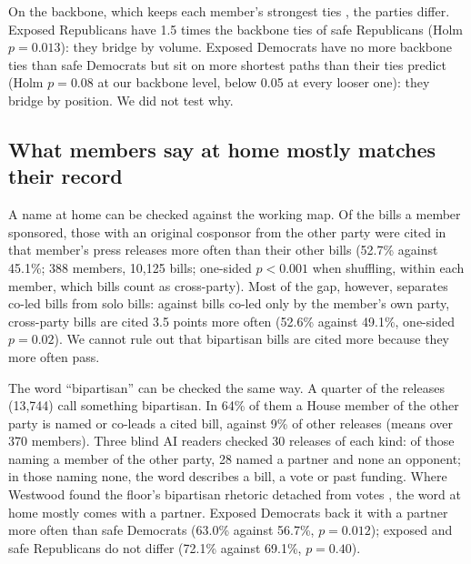 \documentclass[9pt,twocolumn,twoside]{pnas-new}
\begin{document}
On the backbone, which keeps each member's strongest ties \cite{serrano2009}, the parties differ. Exposed
Republicans have 1.5 times the backbone ties of safe Republicans (Holm $p = 0.013$): they bridge by volume. Exposed
Democrats have no more backbone ties than safe Democrats but sit on more shortest paths than their ties predict (Holm
$p = 0.08$ at our backbone level, below 0.05 at every looser one): they bridge by position. We did not test why.

\subsection*{What members say at home mostly matches their record}

A name at home can be checked against the working map. Of the bills a member sponsored, those with an original
cosponsor from the other party were cited in that member's press releases more often than their other bills (52.7\%
against 45.1\%; 388 members, 10,125 bills; one-sided $p < 0.001$ when shuffling, within each member, which bills count
as cross-party). Most of the gap, however, separates co-led bills from solo bills: against bills co-led only by the
member's own party, cross-party bills are cited 3.5 points more often (52.6\% against 49.1\%, one-sided $p = 0.02$).
We cannot rule out that bipartisan bills are cited more because they more often pass.

The word ``bipartisan'' can be checked the same way. A quarter of the releases (13,744) call something bipartisan. In
64\% of them a House member of the other party is named or co-leads a cited bill, against 9\% of other releases (means
over 370 members). Three blind AI readers checked 30 releases of each kind: of those naming a member of the other
party, 28 named a partner and none an opponent; in those naming none, the word describes a bill, a vote or past
funding. Where Westwood found the floor's bipartisan rhetoric detached from votes \cite{westwood2022}, the word at
home mostly comes with a partner. Exposed Democrats back it with a partner more often than safe Democrats (63.0\%
against 56.7\%, $p = 0.012$); exposed and safe Republicans do not differ (72.1\% against 69.1\%, $p = 0.40$).

\end{document}
